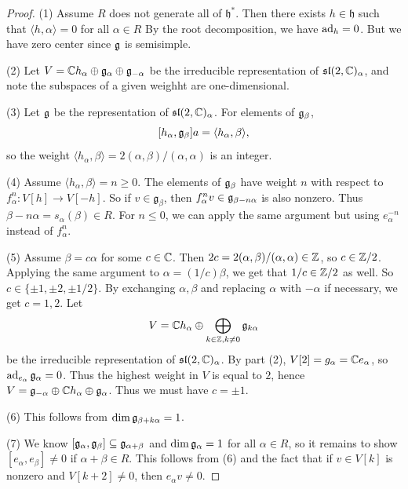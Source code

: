 \begin{proof}
  (1) Assume $R$ does not generate all of
  $\mathfrak{h}^*$. Then there exists $h \in \mathfrak{h}$ 
  such that $\langle h, \alpha \rangle = 0$
  for all $\alpha \in R$ By the root
  decomposition, we have $\operatorname{ad}_h = 0$. But
  we have zero center since $\mathfrak{g}$ is
  semisimple.

  (2) Let $V = \mathbb{C} h_\alpha \oplus \mathfrak{g}_\alpha \oplus \mathfrak{g}_{-\alpha}$
  be the irreducible representation
  of $\mathfrak{sl}(2, \mathbb{C})_\alpha$, and note
  the subspaces of a given weighht are
  one-dimensional.

  (3) Let $\mathfrak{g}$ be the representation
  of $\mathfrak{sl}(2, \mathbb{C})_\alpha$. For
  elements of $\mathfrak{g}_\beta$,
  \[
    [h_\alpha, \mathfrak{g}_\beta]a
   = \langle h_\alpha, \beta \rangle,
   \]
   so the weight $\langle h_\alpha, \beta \rangle = 2(\alpha, \beta) / (\alpha, \alpha)$
   is an integer.

   (4) Assume
  $\langle h_\alpha, \beta \rangle = n \ge 0$.
  The elements of $\mathfrak{g}_\beta$ have weight $n$
  with respect to
  $f^n_\alpha : V[h] \to V[-h]$.  So if
  $v \in \mathfrak{g}_\beta$, then
  $f^n_\alpha v \in \mathfrak{g}_{\beta - n\alpha}$
  is also nonzero. Thus
  $\beta - n \alpha = s_\alpha(\beta) \in R$.
  For $n \le 0$, we can apply the
  same argument but using $e_\alpha^{-n}$
  instead of $f_\alpha^n$.

  (5) Assume $\beta = c \alpha$ for
  some $c \in \mathbb{C}$. Then
  $2c = 2(\alpha, \beta) / (\alpha, \alpha) \in \mathbb{Z}$,
  so $c \in \mathbb{Z} / 2$. Applying the
  same argument to $\alpha = (1 / c) \beta$,
  we get that $1 / c \in \mathbb{Z} / 2$ as well.
  So $c \in \{\pm 1, \pm 2, \pm 1 / 2\}$.
  By exchanging $\alpha, \beta$ and
  replacing $\alpha$ with $-\alpha$
  if necessary, we get
  $c = 1, 2$. Let
  \[
    V = \mathbb{C} h_\alpha \oplus
    \bigoplus_{k \in \mathbb{Z}, k \ne 0} \mathfrak{g}_{k\alpha}
  \]
  be the irreducible representation of
  $\mathfrak{sl}(2, \mathbb{C})_\alpha$. By
  part (2), $V[2] = g_\alpha = \mathbb{C} e_\alpha$,
  so $\operatorname{ad}_{e_\alpha} \mathfrak{g}_\alpha = 0$.
  Thus the highest weight in $V$ is equal
  to $2$, hence
  $V = \mathfrak{g}_{- \alpha} \oplus \mathbb{C} h_\alpha \oplus \mathfrak{g}_\alpha$.
  Thus we must have $c = \pm 1$.

  (6) This follows from
  $\dim \mathfrak{g}_{\beta + k\alpha} = 1$.

  (7) We know
  $[\mathfrak{g}_\alpha, \mathfrak{g}_\beta] \subseteq \mathfrak{g}_{\alpha + \beta}$
  and $\dim \mathfrak{g}_\alpha = 1$ for all
  $\alpha \in R$, so it remains to show
  $[e_\alpha, e_\beta] \ne 0$
  if $\alpha + \beta \in R$.
  This follows from (6) and the
  fact that if $v \in V[k]$ is nonzero and
  $V[k + 2] \ne 0$, then $e_\alpha v \ne 0$.
\end{proof}

